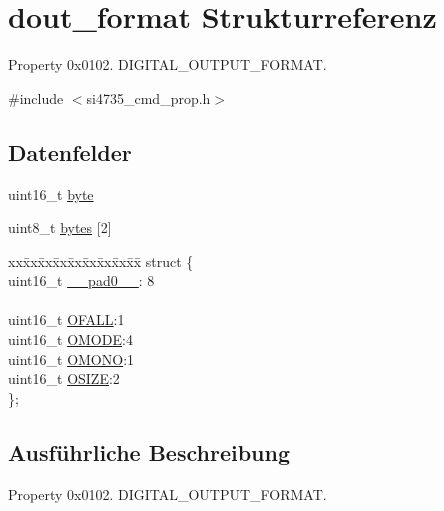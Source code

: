 \hypertarget{uniondout__format}{}\section{dout\+\_\+format Strukturreferenz}
\label{uniondout__format}


Property 0x0102. D\+I\+G\+I\+T\+A\+L\+\_\+\+O\+U\+T\+P\+U\+T\+\_\+\+F\+O\+R\+M\+A\+T.  




{\ttfamily \#include $<$si4735\+\_\+cmd\+\_\+prop.\+h$>$}

\subsection*{Datenfelder}
\begin{DoxyCompactItemize}
\item 
uint16\+\_\+t \hyperlink{uniondout__format_ab0549c1b5ea980a02e7eab77e21fea49}{byte}
\item 
uint8\+\_\+t \hyperlink{uniondout__format_a46e4c05d20a047ec169f60d3167e912e}{bytes} \mbox{[}2\mbox{]}
\item 
\begin{tabbing}
xx\=xx\=xx\=xx\=xx\=xx\=xx\=xx\=xx\=\kill
struct \{\\
\>uint16\_t \hyperlink{uniondout__format_a77132c2c26a75f5b8751b235cda23828}{\_\_pad0\_\_}: 8\\
\>\\
\>uint16\_t \hyperlink{uniondout__format_a8c5f2c1b3351eb9150cc41a003cff4df}{OFALL}:1\\
\>uint16\_t \hyperlink{uniondout__format_a4d995054bef39e68df20343ec82ae5b9}{OMODE}:4\\
\>uint16\_t \hyperlink{uniondout__format_a93761dc84dd5d349d8133cbd92a5f9b5}{OMONO}:1\\
\>uint16\_t \hyperlink{uniondout__format_a7b03eaf984aaf8efadcedcfabd0df922}{OSIZE}:2\\
\}; \\

\end{tabbing}\end{DoxyCompactItemize}


\subsection{Ausführliche Beschreibung}
Property 0x0102. D\+I\+G\+I\+T\+A\+L\+\_\+\+O\+U\+T\+P\+U\+T\+\_\+\+F\+O\+R\+M\+A\+T. 

